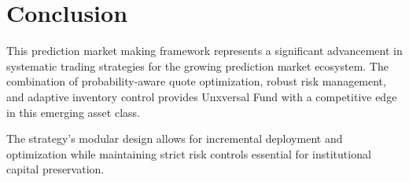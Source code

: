\documentclass[11pt]{article}
\begin{document}
\section{Conclusion}

This prediction market making framework represents a significant advancement in systematic trading strategies for the growing prediction market ecosystem. The combination of probability-aware quote optimization, robust risk management, and adaptive inventory control provides Unxversal Fund with a competitive edge in this emerging asset class.

The strategy's modular design allows for incremental deployment and optimization while maintaining strict risk controls essential for institutional capital preservation.
\end{document}
